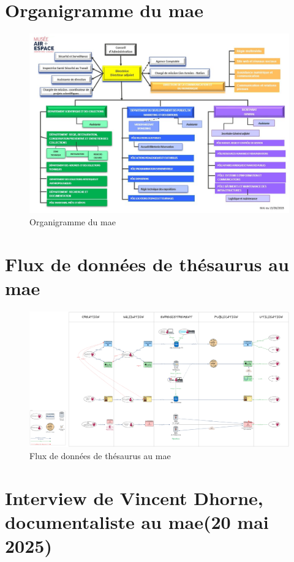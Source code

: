 \documentclass[12pt,twoside]{book}
\newcommand{\mae}{\ac{mae}}
\begin{document}
	\chapter[Organigramme]{\label{Ax-B}Organigramme du \mae}
	\begin{figure}[htbp]
		\includegraphics[width=\linewidth]{img/SCHEM_organigramme.jpg}
		\caption{Organigramme du \mae}
		\label{fig:schem_organigramme}
	\end{figure}
	
	\chapter[Flux de données]{\label{Ax-C}Flux de données de thésaurus au \mae}
	\begin{figure}[htbp]
		\includegraphics[width=\textwidth]{img/MODEL_Flux.png}
		\caption{Flux de données de thésaurus au \mae}
		\label{fig:model_flux}
	\end{figure}
	
	\chapter[Interview V. Dhorne]{\label{Ax-D}Interview de Vincent Dhorne, documentaliste au \mae (20 mai 2025)}
		
	\newpage{\pagestyle{empty}\cleardoublepage}
	
\end{document}

